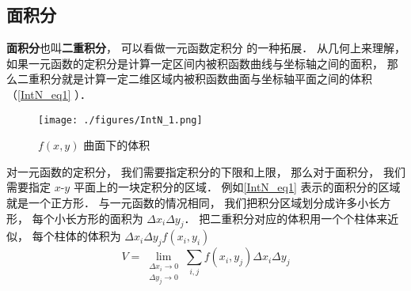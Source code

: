 
\subsection{面积分}
\textbf{面积分}也叫\textbf{二重积分}， 可以看做一元函数定积分 的一种拓展． 从几何上来理解， 如果一元函数的定积分是计算一定区间内被积函数曲线与坐标轴之间的面积， 那么二重积分就是计算一定二维区域内被积函数曲面与坐标轴平面之间的体积（\autoref{IntN_eq1} ）．

\begin{figure}[ht]
\centering
\texttt{[image: ./figures/IntN\_1.png]}
\caption{$f(x, y)$ 曲面下的体积} \label{IntN_fig1}
\end{figure}

对一元函数的定积分， 我们需要指定积分的下限和上限， 那么对于面积分， 我们需要指定 $x$-$y$ 平面上的一块定积分的区域． 例如\autoref{IntN_eq1} 表示的面积分的区域就是一个正方形． 与一元函数的情况相同， 我们把积分区域划分成许多小长方形， 每个小长方形的面积为 $\Delta x_i \Delta y_j$． 把二重积分对应的体积用一个个柱体来近似， 每个柱体的体积为 $\Delta x_i \Delta y_j f(x_i, y_i)$
\begin{equation}\label{IntN_eq1}
V = \lim_{\substack{\Delta x_i\to 0\\ \Delta y_j\to 0}} \sum_{i, j} f(x_i,y_j) \Delta x_i \Delta y_j
\end{equation}

